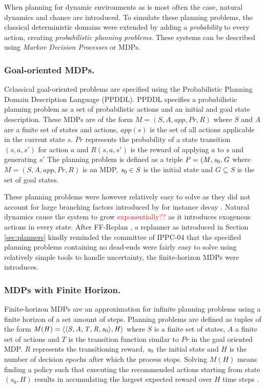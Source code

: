 \documentclass[runningheads,a4paper]{llncs}
\newcommand\myworries[1]{\textcolor{red}{#1}}
\begin{document}
When planning for dynamic environments as is most often the case, natural dynamics and chance are introduced. To simulate these planning problems, the classical deterministic domains were extended by adding a \emph{probability} to every action, creating \emph{probabilistic planning problems}. These systems can be described using \emph{Markov Decision Processes} or MDPs. 

\subsubsection{Goal-oriented MDPs. }Cclassical goal-oriented problems are specified using the Probabilistic Planning Domain Description Language (PPDDL). PPDDL specifies a probabilistic planning problem as a set of probabilistic actions and an initial and goal state description\cite{FFReplan}. These MDPs are of the form $\mathit{M = (S, A, app, Pr, R)}$ where $\mathit{S}$ and $\mathit{A}$ are a finite set of states and actions, $\mathit{app(s)}$ is the set of all actions applicable in the current state $\mathit{s}$. $\mathit{Pr}$ represents the probability of a state transition $\mathit{(s, a, s')}$ for action $\mathit{a}$ and $\mathit{R(s, a, s')}$ is the reward of applying $\mathit{a}$ to $\mathit{s}$ and generating $\mathit{s'}$ The planning problem is defined as a triple $\mathit{P = (M, s\textsubscript{0}, G}$ where $\mathit{M = (S, A, app, Pr, R)}$ is an MDP, $\mathit{s\textsubscript{0} \in S}$ is the initial state and $\mathit{G \subseteq S}$ is the set of goal states.

These planning problems were however relatively easy to solve as they did not account for large branching factors introduced by for instance decay \cite{kolobov2012glutton}. Natural dynamics cause the system to grow \myworries{exponentially??} as it introduces exogenous actions in every state. After FF-Replan \cite{FFReplan}, a replanner as introduced in Section  \ref{sec:planners} kindly reminded the committee of IPPC-04 that the specified planning problems containing no dead-ends were fairly easy to solve using relatively simple tools to handle uncertainty, the finite-horizon MDPs were introduces. 

\subsubsection{MDPs with Finite Horizon. } Finite-horizon MDPs are an approximation for infinite planning problems using a finite horizon of a set amount of steps. Planning problems are defined as tuples of the form $\mathit{M(H) = \langle \langle S, A, T, R, s\textsubscript{0} \rangle , H \rangle }$ where $\mathit{S}$ is a finite set of states, $\mathit{A}$ a finite set of actions and $\mathit{T}$ is the transition function similar to $\mathit{Pr}$ in the goal oriented MDP. $\mathit{R}$ represents the transitioning reward, $\mathit{s\textsubscript{0}}$ the initial state and $\mathit{H}$ is the number of decision epochs after which the process stops. Solving $\mathit{M(H)}$ means finding a policy such that executing the recommended actions starting from state $(s_0, H)$ results in accumulating the largest expected reward over $H$ time steps \cite{kolobov2012glutton}.
\end{document}
